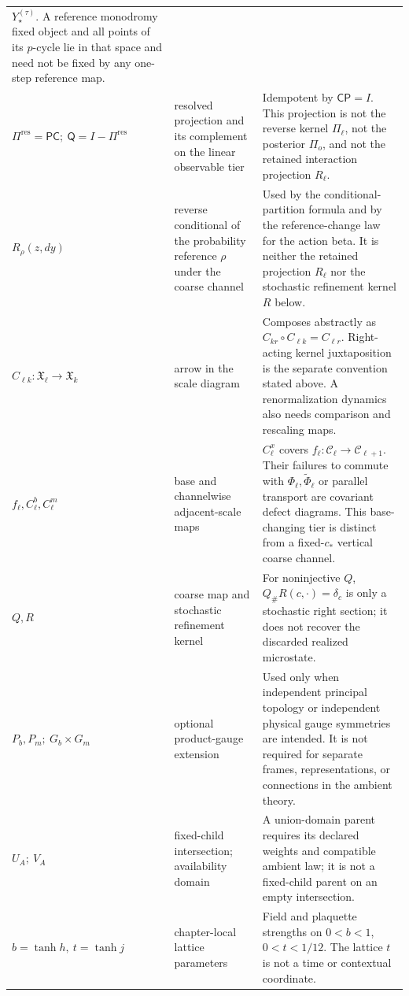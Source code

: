 \begin{longtable}{@{}>{\raggedright\arraybackslash}p{}
>{\raggedright\arraybackslash}p{}
>{\raggedright\arraybackslash}p{}@{}}
\(Y_\star^{(\tau)}\).  A reference monodromy fixed object and all points of
its \(p\)-cycle lie in that space and need not be fixed by any one-step
reference map. \\
\(\Pi^{\mathrm{res}}=\mathsf P\mathsf C;\ \mathsf Q=I-\Pi^{\mathrm{res}}\) &
resolved projection and its complement on the linear observable tier &
Idempotent by \(\mathsf C\mathsf P=I\).  This projection is not the reverse
kernel \(\Pi_\ell\), not the posterior \(\Pi_o\), and not the retained
interaction projection \(R_\ell\). \\
\(R_\rho(z,dy)\) &
reverse conditional of the probability reference \(\rho\) under the coarse
channel &
Used by the conditional-partition formula and by the reference-change law for
the action beta.  It is neither the retained projection \(R_\ell\) nor the
stochastic refinement kernel \(R\) below. \\
\(C_{\ell k}:\mathfrak X_\ell\to\mathfrak X_k\) &
arrow in the scale diagram &
Composes abstractly as \(C_{kr}\circ C_{\ell k}=C_{\ell r}\).  Right-acting
kernel juxtaposition is the separate convention stated above.  A renormalization dynamics
also needs comparison and rescaling maps. \\
\(f_\ell,C_\ell^b,C_\ell^m\) &
base and channelwise adjacent-scale maps &
\(C_\ell^x\) covers \(f_\ell:\mathcal C_\ell\to\mathcal C_{\ell+1}\). Their failures to commute with
\(\Phi_\ell,\widetilde\Phi_\ell\) or parallel transport are covariant
defect diagrams. This base-changing tier is distinct from a fixed-\(c_*\)
vertical coarse channel. \\
\(Q,R\) &
coarse map and stochastic refinement kernel &
For noninjective \(Q\), \(Q_\#R(c,\cdot)=\delta_c\) is only a stochastic
right section; it does not recover the discarded realized microstate. \\
\(P_b,P_m;\ G_b\times G_m\) &
optional product-gauge extension &
Used only when independent principal topology or independent physical gauge
symmetries are intended. It is not required for separate frames,
representations, or connections in the ambient theory. \\
\(U_A;\ V_A\) &
fixed-child intersection; availability domain &
A union-domain parent requires its declared weights and compatible ambient
law; it is not a fixed-child parent on an empty intersection. \\
\(b=\tanh h,\ t=\tanh j\) &
chapter-local lattice parameters &
Field and plaquette strengths on $0<b<1$, $0<t<1/12$.
The lattice $t$ is not a time or contextual coordinate. \\

\end{longtable}
